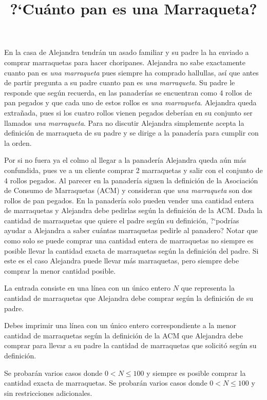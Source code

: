 \documentclass{oci}
\title{?`Cuánto pan es una Marraqueta?}
\begin{document}
\begin{problemDescription}
En la casa de Alejandra tendrán un asado familiar y su padre la ha enviado a comprar marraquetas para hacer choripanes.
Alejandra no sabe exactamente cuanto pan es \textit{una marraqueta} pues siempre ha comprado hallullas, así que antes de partir pregunta a su padre cuanto pan es \textit{una marraqueta}.
Su padre le responde que según recuerda, en las panaderías se encuentran como 4 rollos de pan pegados y que cada uno de estos rollos es \textit{una marraqueta}.
Alejandra queda extrañada, pues si los cuatro rollos vienen pegados deberían en su conjunto ser llamados \textit{una marraqueta}.
Para no discutir Alejandra simplemente acepta la definición de marraqueta de su padre y se dirige a la panadería para cumplir con la orden.

Por si no fuera ya el colmo al llegar a la panadería Alejandra queda aún más confundida, pues ve a un cliente comprar 2 marraquetas y salir con el conjunto de 4 rollos pegados.
Al parecer en la panadería siguen la definición de la Asociación de Consumo de Marraquetas (ACM) y consideran que \textit{una marraqueta} son dos rollos de pan pegados. 
En la panadería solo pueden vender una cantidad entera de marraquetas y Alejandra debe pedirlas según la definición de la ACM\@.
Dada la cantidad de marraquetas que quiere el padre según su definición, ?`podrías ayudar a Alejandra a saber cuántas marraquetas pedirle al panadero?
Notar que como solo se puede comprar una cantidad entera de marraquetas no siempre es posible llevar la cantidad exacta de marraquetas según la definición del padre.
Si este es el caso Alejandra puede llevar más marraquetas, pero siempre debe comprar la menor cantidad posible.

\end{problemDescription}

\begin{inputDescription}
La entrada consiste en una línea con un único entero $N$ que representa la cantidad de marraquetas que Alejandra debe comprar según la definición de su padre.
\end{inputDescription}

\begin{outputDescription}
Debes imprimir una línea con un único entero correspondiente a la menor cantidad de marraquetas según la definición de la ACM que Alejandra debe comprar para llevar a su padre la cantidad de marraquetas que solicitó según su definición.
\end{outputDescription}

\begin{scoreDescription}
   Se probarán varios casos donde $0<N\leq 100$ y siempre es posible comprar la cantidad exacta de marraquetas. 
   Se probarán varios casos donde $0<N\leq 100$ y sin restricciones adicionales.
\end{scoreDescription}

\begin{sampleDescription}
\end{sampleDescription}
\end{document}
